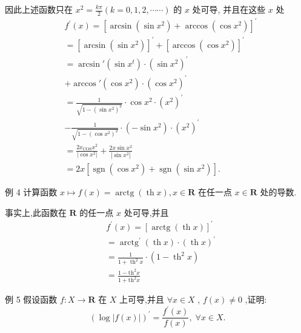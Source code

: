 因此上述函数只在 ${x}^{2} = \frac{k\pi }{2}\left( {k = 0,1,2,\cdots \cdots }\right)$ 的 $x$ 处可导, 并且在这些 $x$ 处
\begin{align*}
	&{f}^{\prime }\left( x\right)  = {\left\lbrack  \arcsin \left( \sin {x}^{2}\right)  + \arccos \left( \cos {x}^{2}\right) \right\rbrack  }^{\prime }\\
	&= {\left\lbrack  \arcsin \left( \sin {x}^{2}\right) \right\rbrack  }^{\prime } + {\left\lbrack  \arccos \left( \cos {x}^{2}\right) \right\rbrack  }^{\prime }\\
	&= \arcsin \prime \left( {\sin {x}^{t}}\right)  \cdot  {\left( \sin {x}^{2}\right) }^{\prime }\\
	&+ \arccos \prime \left( {\cos {x}^{2}}\right)  \cdot  {\left( \cos {x}^{2}\right) }^{\prime }\\
	&= \frac{1}{\sqrt{1 - {\left( \sin {x}^{2}\right) }^{2}}} \cdot  \cos {x}^{2} \cdot  {\left( {x}^{2}\right) }^{\prime }\\
	&- \frac{1}{\sqrt{1 - {\left( \cos {x}^{2}\right) }^{2}}} \cdot  \left( {-\sin {x}^{2}}\right)  \cdot  {\left( {x}^{2}\right) }^{\prime }\\
	&= \frac{2{x}_{\mathrm{{COS}}}{x}^{2}}{\left| \cos {x}^{2}\right| } + \frac{{2x}\sin {x}^{2}}{\left| \sin {x}^{2}\right| }\\
	&= {2x}\left\lbrack  {\operatorname{sgn}\left( {\cos {x}^{2}}\right)  + \operatorname{sgn}\left( {\sin {x}^{2}}\right) }\right\rbrack  .
\end{align*}

例 4 计算函数 $x \mapsto  f\left( x\right)  = \operatorname{arctg}\left( {\operatorname{th}x}\right) ,x \in  \mathbf{R}$ 在任一点 $x \in  \mathbf{R}$ 处的导数.

事实上,此函数在 $\mathbf{R}$ 的任一点 $x$ 处可导,并且
\begin{align*}
	&{f}^{\prime }\left( x\right)  = {\left\lbrack  \operatorname{arctg}\left( \operatorname{th}x\right) \right\rbrack  }^{\prime }\\
	&= {\operatorname{arctg}}^{\prime }\left( {\operatorname{th}x}\right)  \cdot  {\left( \operatorname{th}x\right) }^{\prime }\\
	&= \frac{1}{1 + {\operatorname{th}}^{2}x} \cdot  \left( {1 - {\operatorname{th}}^{2}x}\right)\\
	&= \frac{1 - {\mathrm{{th}}}^{2}x}{1 + {\mathrm{{th}}}^{2}x}
\end{align*}

例 5 假设函数 $f : X \rightarrow  \mathbf{R}$ 在 $X$ 上可导,并且 $\forall x \in  X$ , $f\left( x\right)  \neq  0$ ,证明:
$${\left( \log \left| f\left( x\right) \right| \right) }^{\prime } = \frac{{f}^{\prime }\left( x\right) }{f\left( x\right) },\;\forall x \in  X.$$

